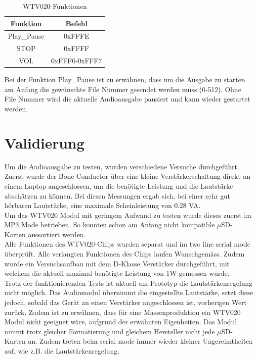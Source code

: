 	
\begin{table}[h]
	\centering
	\begin{tabular}{|c|c|} 
		Funktion & Befehl\\ 
		\hline 
		Play\_Pause & 0xFFFE \\ 
		\hline 
		STOP & 0xFFFF \\ 
		\hline 
		VOL & 0xFFF0-0xFFF7 \\ 
	\end{tabular} 
	\caption{WTV020 Funktionen}
	\label{WTVFunktionen}
\end{table} 

Bei der Funktion Play\_Pause ist zu erwähnen, dass um die Ausgabe zu starten am Anfang die gewünschte File Nummer gesendet werden muss (0-512). Ohne File Nummer wird die aktuelle Audioausgabe pausiert und kann wieder gestartet werden.

\section{Validierung}
Um die Audioausgabe zu testen, wurden verschiedene Versuche durchgeführt. Zuerst wurde der Bone Conductor über eine kleine Verstärkerschaltung direkt an einem Laptop angeschlossen, um die benötigte Leistung und die Lautstärke abschätzen zu können. Bei diesen Messungen ergab sich, bei einer sehr gut hörbaren Lautstärke, eine maximale Scheinleistung von 0.28 VA.\\
Um das WTV020 Modul mit geringem Aufwand zu testen wurde dieses zuerst im MP3 Mode betrieben.
So konnten schon am Anfang nicht kompatible $\mu$SD-Karten aussortiert werden. \\
Alle Funktionen des WTV020-Chips wurden separat und im two line serial mode überprüft. Alle verlangten Funktionen des Chips laufen Wunschgemäss. Zudem wurde ein Versuchsaufbau mit dem D-Klasse Verstärker durchgeführt, mit welchem die aktuell maximal benötigte Leistung von 1W gemessen wurde. \\
Trotz der funktionierenden Tests ist aktuell am Prototyp die Lautstärkenregelung nicht möglich. Das Audiomodul übernimmt die eingestellte Lautstärke, setzt diese jedoch, sobald das Gerät an einen Verstärker angeschlossen ist, vorherigen Wert zurück. Zudem ist zu erwähnen, dass für eine Massenproduktion ein WTV020 Modul nicht geeignet wäre, aufgrund der erwähnten Eigenheiten. Das Modul nimmt trotz gleicher Formatierung und gleichem Hersteller nicht jede $\mu$SD-Karten an. Zudem treten beim serial mode immer wieder kleiner Ungereimtheiten auf, wie z.B. die Lautstärkenregelung. 
